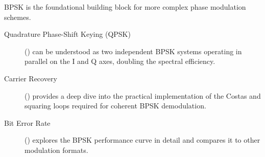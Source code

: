 \begin{importantbox}[title={Further Reading}]
    BPSK is the foundational building block for more complex phase modulation schemes.
    \begin{description}
        \item[Quadrature Phase-Shift Keying (QPSK)] () can be understood as two independent BPSK systems operating in parallel on the I and Q axes, doubling the spectral efficiency.
        \item[Carrier Recovery] () provides a deep dive into the practical implementation of the Costas and squaring loops required for coherent BPSK demodulation.
        \item[Bit Error Rate] () explores the BPSK performance curve in detail and compares it to other modulation formats.
    \end{description}
\end{importantbox}
